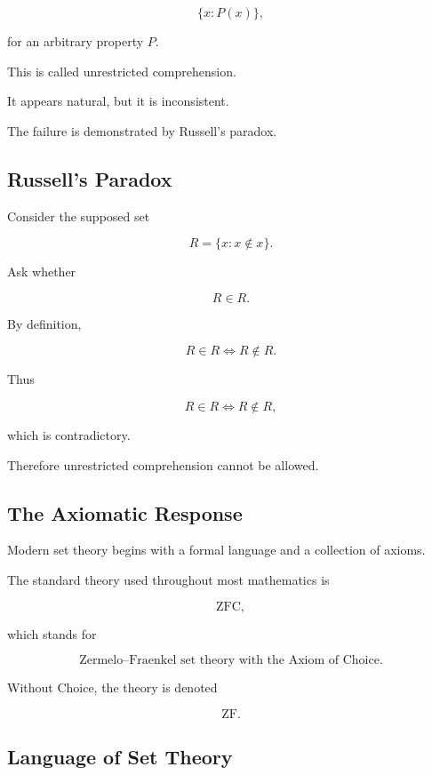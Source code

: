 \[
\boxed{
\{x:P(x)\},
}
\]

for an arbitrary property \(P\).

This is called unrestricted comprehension.

It appears natural, but it is inconsistent.

The failure is demonstrated by Russell's paradox.

\subsection{Russell's Paradox}
\label{subsec:russells-paradox}

Consider the supposed set

\[
\boxed{
R
=
\{x:x\notin x\}.
}
\]

Ask whether

\[
R\in R.
\]

By definition,

\[
R\in R
\iff
R\notin R.
\]

Thus

\[
\boxed{
R\in R
\iff
R\notin R,
}
\]

which is contradictory.

Therefore unrestricted comprehension cannot be allowed.

\subsection{The Axiomatic Response}
\label{subsec:axiomatic-response}

Modern set theory begins with a formal language and a collection of axioms.

The standard theory used throughout most mathematics is

\[
\boxed{
\mathrm{ZFC},
}
\]

which stands for

\[
\boxed{
\text{Zermelo--Fraenkel set theory with the Axiom of Choice}.
}
\]

Without Choice, the theory is denoted

\[
\boxed{
\mathrm{ZF}.
}
\]

\subsection{Language of Set Theory}
\label{subsec:language-of-set-theory}

